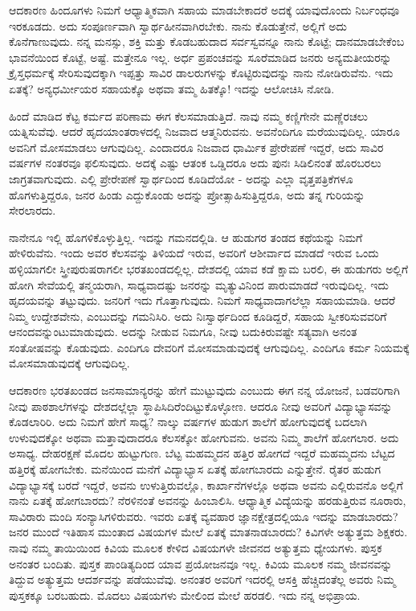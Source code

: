 ಆದಕಾರಣ ಹಿಂದೂಗಳು ನಿಮಗೆ ಆಧ್ಯಾತ್ಮಿಕವಾಗಿ ಸಹಾಯ ಮಾಡಬೇಕಾದರೆ ಅದಕ್ಕೆ ಯಾವುದೊಂದು ನಿರ್ಬಂಧವೂ ಇರಕೂಡದು. ಅದು ಸಂಪೂರ್ಣವಾಗಿ ಸ್ವಾರ್ಥಹೀನವಾಗಿರಬೇಕು. ನಾನು ಕೊಡುತ್ತೇನೆ, ಅಲ್ಲಿಗೆ ಅದು ಕೊನೆಗಾಣುವುದು. ನನ್ನ ಮನಸ್ಸು, ಶಕ್ತಿ ಮತ್ತು ಕೊಡಬಹುದಾದ ಸರ್ವಸ್ವವನ್ನೂ ನಾನು ಕೊಟ್ಟೆ; ದಾನಮಾಡಬೇಕೆಂಬ ಭಾವನೆಯಿಂದ ಕೊಟ್ಟೆ, ಅಷ್ಟೆ. ಮತ್ತೇನೂ ಇಲ್ಲ. ಅರ್ಧ ಪ್ರಪಂಚವನ್ನು ಸೂರೆಮಾಡಿದ ಜನರು ಅನ್ಯಮತೀಯರನ್ನು ಕ್ರೈಸ್ತಧರ್ಮಕ್ಕೆ ಸೇರಿಸುವುದಕ್ಕಾಗಿ ಇಪ್ಪತ್ತು ಸಾವಿರ ಡಾಲರುಗಳನ್ನು ಕೊಟ್ಟಿರುವುದನ್ನು ನಾನು ನೋಡಿರುವೆನು. ಇದು ಏತಕ್ಕೆ? ಅನ್ಯಧರ್ಮೀಯರ ಸಹಾಯಕ್ಕೊ ಅಥವಾ ತಮ್ಮ ಹಿತಕ್ಕೊ! ಇದನ್ನು ಆಲೋಚಿಸಿ ನೋಡಿ.

ಹಿಂದೆ ಮಾಡಿದ ಕೆಟ್ಟ ಕರ್ಮದ ಪರಿಣಾಮ ಈಗ ಕೆಲಸಮಾಡುತ್ತಿದೆ. ನಾವು ನಮ್ಮ ಕಣ್ಣಿಗೇನೇ ಮಣ್ಣೆರಚಲು ಯತ್ನಿಸುವೆವು. ಆದರೆ ಹೃದಯಾಂತರಾಳದಲ್ಲಿ ನಿಜವಾದ ಆತ್ಮನಿರುವನು. ಅವನೆಂದಿಗೂ ಮರೆಯುವುದಿಲ್ಲ. ಯಾರೂ ಅವನಿಗೆ ಮೋಸಮಾಡಲು ಆಗುವುದಿಲ್ಲ. ಎಂದಾದರೂ ನಿಜವಾದ ಧಾರ್ಮಿಕ ಪ್ರೇರೇಪಣೆ ಇದ್ದರೆ, ಅದು ಸಾವಿರ ವರ್ಷಗಳ ನಂತರವೂ ಫಲಿಸುವುದು. ಅದಕ್ಕೆ ಎಷ್ಟು ಆತಂಕ ಒಡ್ಡಿದರೂ ಅದು ಪುನಃ ಸಿಡಿಲಿನಂತೆ ಹೊರಬರಲು ಜಾಗ್ರತವಾಗುವುದು. ಎಲ್ಲಿ ಪ್ರೇರೇಪಣೆ ಸ್ವಾರ್ಥದಿಂದ ಕೂಡಿದೆಯೋ - ಅದನ್ನು ಎಲ್ಲಾ ವೃತ್ತಪತ್ರಿಕೆಗಳೂ ಹೊಗಳುತ್ತಿದ್ದರೂ, ಜನರ ಹಿಂಡು ಎದ್ದುಕೊಂಡು ಅದನ್ನು ಪ್ರೋತ್ಸಾಹಿಸುತ್ತಿದ್ದರೂ, ಅದು ತನ್ನ ಗುರಿಯನ್ನು ಸೇರಲಾರದು.

ನಾನೇನೂ ಇಲ್ಲಿ ಹೊಗಳಿಕೊಳ್ಳುತ್ತಿಲ್ಲ. ಇದನ್ನು ಗಮನದಲ್ಲಿಡಿ. ಆ ಹುಡುಗರ ತಂಡದ ಕಥೆಯನ್ನು ನಿಮಗೆ ಹೇಳಿರುವೆನು. ಇಂದು ಅವರ ಕೆಲಸವನ್ನು ತಿಳಿಯದೆ ಇರುವ, ಅವರಿಗೆ ಆಶೀರ್ವಾದ ಮಾಡದೆ ಇರುವ ಒಂದು ಹಳ್ಳಿಯಾಗಲೀ ಸ್ತ್ರೀಪುರುಷರಾಗಲೀ ಭರತಖಂಡದಲ್ಲಿಲ್ಲ. ದೇಶದಲ್ಲಿ ಯಾವ ಕಡೆ ಕ್ಷಾಮ ಬರಲಿ, ಈ ಹುಡುಗರು ಅಲ್ಲಿಗೆ ಹೋಗಿ ಸೇವೆಯಲ್ಲಿ ತನ್ಮಯರಾಗಿ, ಸಾಧ್ಯವಾದಷ್ಟು ಜನರನ್ನು ಮೃತ್ಯುವಿನಿಂದ ಪಾರುಮಾಡದೆ ಇರುವುದಿಲ್ಲ. ಇದು ಹೃದಯವನ್ನು ತಟ್ಟುವುದು. ಜನರಿಗೆ ಇದು ಗೊತ್ತಾಗುವುದು. ನಿಮಗೆ ಸಾಧ್ಯವಾದಾಗಲೆಲ್ಲಾ ಸಹಾಯಮಾಡಿ. ಆದರೆ ನಿಮ್ಮ ಉದ್ದೇಶವೇನು, ಎಂಬುದನ್ನು ಗಮನಿಸಿರಿ. ಅದು ನಿಃಸ್ವಾರ್ಥದಿಂದ ಕೂಡಿದ್ದರೆ, ಸಹಾಯ ಸ್ವೀಕರಿಸುವವರಿಗೆ ಆನಂದವನ್ನುಂಟುಮಾಡುವುದು. ಅದನ್ನು ನೀಡುವ ನಿಮಗೂ, ನೀವು ಬದುಕಿರುವಷ್ಟೇ ಸತ್ಯವಾಗಿ ಅನಂತ ಸಂತೋಷವನ್ನು ಕೊಡುವುದು. ಎಂದಿಗೂ ದೇವರಿಗೆ ಮೋಸಮಾಡುವುದಕ್ಕೆ ಆಗುವುದಿಲ್ಲ. ಎಂದಿಗೂ ಕರ್ಮ ನಿಯಮಕ್ಕೆ ಮೋಸಮಾಡುವುದಕ್ಕೆ ಆಗುವುದಿಲ್ಲ.

ಆದಕಾರಣ ಭರತಖಂಡದ ಜನಸಾಮಾನ್ಯರನ್ನು ಹೇಗೆ ಮುಟ್ಟುವುದು ಎಂಬುದು ಈಗ ನನ್ನ ಯೋಜನೆ, ಬಡವರಿಗಾಗಿ ನೀವು ಪಾಠಶಾಲೆಗಳನ್ನು ದೇಶದಲ್ಲೆಲ್ಲಾ ಸ್ಥಾಪಿಸಿದಿರೆಂದಿಟ್ಟುಕೊಳ್ಳೋಣ. ಆದರೂ ನೀವು ಅವರಿಗೆ ವಿದ್ಯಾಭ್ಯಾಸವನ್ನು ಕೊಡಲಾರಿರಿ. ಅದು ನಿಮಗೆ ಹೇಗೆ ಸಾಧ್ಯ? ನಾಲ್ಕು ವರ್ಷಗಳ ಹುಡುಗ ಶಾಲೆಗೆ ಹೋಗುವುದಕ್ಕೆ ಬದಲಾಗಿ ಉಳುವುದಕ್ಕೋ ಅಥವಾ ಮತ್ತಾವುದಾದರೂ ಕೆಲಸಕ್ಕೋ ಹೋಗುವನು. ಅವನು ನಿಮ್ಮ ಶಾಲೆಗೆ ಹೋಗಲಾರ. ಅದು ಅಸಾಧ್ಯ. ದೇಹರಕ್ಷಣೆ ಮೊದಲ ಹುಟ್ಟುಗುಣ. ಬೆಟ್ಟ ಮಹಮ್ಮದನ ಹತ್ತಿರ ಹೋಗದೆ ಇದ್ದರೆ ಮಹಮ್ಮದನು ಬೆಟ್ಟದ ಹತ್ತಿರಕ್ಕೆ ಹೋಗಬೇಕು. ಮನೆಯಿಂದ ಮನೆಗೆ ವಿದ್ಯಾಭ್ಯಾಸ ಏತಕ್ಕೆ ಹೋಗಬಾರದು ಎನ್ನುತ್ತೇನೆ. ರೈತರ ಹುಡುಗ ವಿದ್ಯಾಭ್ಯಾಸಕ್ಕೆ ಬರದೆ ಇದ್ದರೆ, ಅವನು ಉಳುತ್ತಿರುವಲ್ಲೊ, ಕಾರ್ಖಾನೆಗಳಲ್ಲೊ ಅಥವಾ ಅವನು ಎಲ್ಲಿರುವನೊ ಅಲ್ಲಿಗೆ ನಾನು ಏತಕ್ಕೆ ಹೋಗಬಾರದು? ನೆರಳಿನಂತೆ ಅವನನ್ನು ಹಿಂಬಾಲಿಸಿ. ಆಧ್ಯಾತ್ಮಿಕ ವಿದ್ಯೆಯನ್ನು ಹರಡುತ್ತಿರುವ ನೂರಾರು, ಸಾವಿರಾರು ಮಂದಿ ಸಂನ್ಯಾಸಿಗಳಿರುವರು. ಇವರು ಏತಕ್ಕೆ ವ್ಯವಹಾರ ಜ್ಞಾನಕ್ಷೇತ್ರದಲ್ಲಿಯೂ ಇದನ್ನು ಮಾಡಬಾರದು? ಜನರ ಮುಂದೆ ಇತಿಹಾಸ ಮುಂತಾದ ವಿಷಯಗಳ ಮೇಲೆ ಏತಕ್ಕೆ ಮಾತನಾಡಬಾರದು? ಕಿವಿಗಳೇ ಅತ್ಯುತ್ತಮ ಶಿಕ್ಷಕರು. ನಾವು ನಮ್ಮ ತಾಯಿಯಿಂದ ಕಿವಿಯ ಮೂಲಕ ಕೇಳಿದ ವಿಷಯಗಳೇ ಜೀವನದ ಅತ್ಯುತ್ತಮ ಧ್ಯೇಯಗಳು. ಪುಸ್ತಕ ಅನಂತರ ಬಂದಿತು. ಪುಸ್ತಕ ಪಾಂಡಿತ್ಯದಿಂದ ಯಾವ ಪ್ರಯೋಜನವೂ ಇಲ್ಲ. ಕಿವಿಯ ಮೂಲಕ ನಮ್ಮ ಜೀವನವನ್ನು ತಿದ್ದುವ ಅತ್ಯುತ್ತಮ ಆದರ್ಶವನ್ನು ಪಡೆಯುವೆವು. ಅನಂತರ ಅವರಿಗೆ ಇದರಲ್ಲಿ ಆಸಕ್ತಿ ಹೆಚ್ಚಿದಂತೆಲ್ಲ ಅವರು ನಿಮ್ಮ ಪುಸ್ತಕಕ್ಕೂ ಬರಬಹುದು. ಮೊದಲು ವಿಷಯಗಳು ಮೇಲಿಂದ ಮೇಲೆ ಹರಡಲಿ. ಇದು ನನ್ನ ಅಭಿಪ್ರಾಯ.

